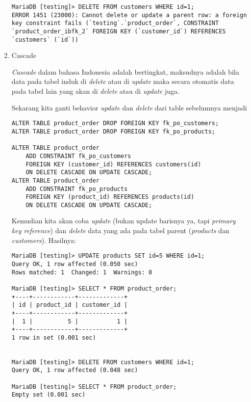 \documentclass[a4paper]{article}
\newcommand{\code}[1]{\allowbreak{\texttt{#1}}}
\begin{document}
\begin{enumerate}
\begin{lstlisting}
MariaDB [testing]> DELETE FROM customers WHERE id=1;
ERROR 1451 (23000): Cannot delete or update a parent row: a foreign key constraint fails (`testing`.`product_order`, CONSTRAINT `product_order_ibfk_2` FOREIGN KEY (`customer_id`) REFERENCES `customers` (`id`))

\end{lstlisting}

	\item Cascade

\textit{Cascade} dalam bahasa Indonesia adalah bertingkat, maksudnya adalah bila data pada tabel induk di \textit{delete} atau di \textit{update} maka secara otomatis data pada tabel lain yang \code{memiliki relasi} akan di \textit{delete} atau di \textit{update} juga.

Sekarang kita ganti behavior \textit{update} dan \textit{delete} dari table sebelumnya menjadi  \code{Cascade}
\begin{lstlisting}
ALTER TABLE product_order DROP FOREIGN KEY fk_po_customers;
ALTER TABLE product_order DROP FOREIGN KEY fk_po_products;

ALTER TABLE product_order
	ADD CONSTRAINT fk_po_customers 
	FOREIGN KEY (customer_id) REFERENCES customers(id)
	ON DELETE CASCADE ON UPDATE CASCADE;
ALTER TABLE product_order 
	ADD CONSTRAINT fk_po_products
	FOREIGN KEY (product_id) REFERENCES products(id)
	ON DELETE CASCADE ON UPDATE CASCADE;
\end{lstlisting}

Kemudian kita akan coba  \textit{update} (bukan update barisnya ya, tapi \textit{primary key reference}) dan \textit{delete} data yang ada pada tabel parent (\textit{products} dan \textit{customers}). Hasilnya:

\begin{lstlisting}
MariaDB [testing]> UPDATE products SET id=5 WHERE id=1;
Query OK, 1 row affected (0.050 sec)
Rows matched: 1  Changed: 1  Warnings: 0

MariaDB [testing]> SELECT * FROM product_order;
+----+------------+-------------+
| id | product_id | customer_id |
+----+------------+-------------+
|  1 |          5 |           1 |
+----+------------+-------------+
1 row in set (0.001 sec)


MariaDB [testing]> DELETE FROM customers WHERE id=1;
Query OK, 1 row affected (0.048 sec)

MariaDB [testing]> SELECT * FROM product_order;
Empty set (0.001 sec)

\end{lstlisting}


\end{enumerate}
\end{document}
